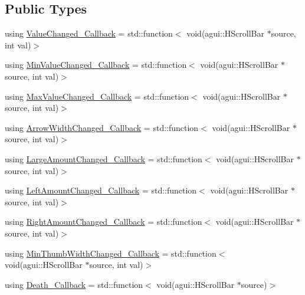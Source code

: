 \subsection*{Public Types}
\begin{DoxyCompactItemize}
\item 
using \mbox{\hyperlink{classec_1_1_generic_h_scroll_bar_listener_ad02a375c4835a99a41bcd97b6a408637}{Value\+Changed\+\_\+\+Callback}} = std\+::function$<$ void(agui\+::\+H\+Scroll\+Bar $\ast$source, int val)$>$
\item 
using \mbox{\hyperlink{classec_1_1_generic_h_scroll_bar_listener_a0e75a452c9f937fb1539bdb395fb62a5}{Min\+Value\+Changed\+\_\+\+Callback}} = std\+::function$<$ void(agui\+::\+H\+Scroll\+Bar $\ast$source, int val)$>$
\item 
using \mbox{\hyperlink{classec_1_1_generic_h_scroll_bar_listener_a477535313b5feb1040874b1c0c9c9d1f}{Max\+Value\+Changed\+\_\+\+Callback}} = std\+::function$<$ void(agui\+::\+H\+Scroll\+Bar $\ast$source, int val)$>$
\item 
using \mbox{\hyperlink{classec_1_1_generic_h_scroll_bar_listener_a5f6e07b1012f51b6ef9be3d9ac81e121}{Arrow\+Width\+Changed\+\_\+\+Callback}} = std\+::function$<$ void(agui\+::\+H\+Scroll\+Bar $\ast$source, int val)$>$
\item 
using \mbox{\hyperlink{classec_1_1_generic_h_scroll_bar_listener_a668ece57152ae7212f4e7b68a202da04}{Large\+Amount\+Changed\+\_\+\+Callback}} = std\+::function$<$ void(agui\+::\+H\+Scroll\+Bar $\ast$source, int val)$>$
\item 
using \mbox{\hyperlink{classec_1_1_generic_h_scroll_bar_listener_ab6d93e64747e807550ab74972a06a608}{Left\+Amount\+Changed\+\_\+\+Callback}} = std\+::function$<$ void(agui\+::\+H\+Scroll\+Bar $\ast$source, int val)$>$
\item 
using \mbox{\hyperlink{classec_1_1_generic_h_scroll_bar_listener_a8fa94a611c4160acb1c5bc062046fc8a}{Right\+Amount\+Changed\+\_\+\+Callback}} = std\+::function$<$ void(agui\+::\+H\+Scroll\+Bar $\ast$source, int val)$>$
\item 
using \mbox{\hyperlink{classec_1_1_generic_h_scroll_bar_listener_a3bfa95b52b5ce492d638cef95b830227}{Min\+Thumb\+Width\+Changed\+\_\+\+Callback}} = std\+::function$<$ void(agui\+::\+H\+Scroll\+Bar $\ast$source, int val)$>$
\item 
using \mbox{\hyperlink{classec_1_1_generic_h_scroll_bar_listener_a20ad93a508cb41b9bd1f2de9f470d617}{Death\+\_\+\+Callback}} = std\+::function$<$ void(agui\+::\+H\+Scroll\+Bar $\ast$source)$>$
\end{DoxyCompactItemize}
